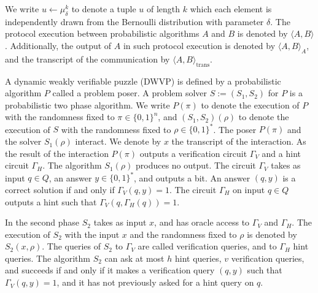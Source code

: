 %
%
\noindent
We write $u \leftarrow \mu_{\delta}^k$ to denote a tuple $u$ of length $k$ which each element
is independently drawn from the Bernoulli distribution with parameter $\delta$.
The protocol execution between probabilistic algorithms $A$ and $B$ is denoted by $\langle A, B \rangle$.
Additionally, the output of $A$ in such protocol execution is denoted by $\langle A, B \rangle_A$, and the transcript
of the communication by $\langle A, B \rangle_{\text{trans}}$.
%
\begin{definition}
  \label{def:dwvp}
  A dynamic weakly verifiable puzzle (DWVP) is defined by a probabilistic algorithm $P$
  called a problem poser.
  A problem solver $S := (S_1, S_2)$ for $P$ is a probabilistic two phase algorithm.
  We write $P(\pi)$ to denote the execution of $P$ with the randomness fixed to $\pi \in \{0,1\}^n$, and $(S_1,S_2)(\rho)$
  to denote the execution of $S$ with the randomness fixed to $\rho \in \{0,1\}^{*}$.
  The poser $P(\pi)$ and the solver $S_1(\rho)$ interact.
  We denote by $x$ the transcript of the interaction.
  As the result of the interaction $P(\pi)$ outputs a verification circuit $\Gamma_{V}$ and a hint circuit $\Gamma_{H}$.
  The algorithm $S_1(\rho)$ produces no output.
  The circuit $\Gamma_{V}$ takes as input $q \in Q$, an answer $y \in \{0,1\}^*$,
  and outputs a bit. An answer $(q,y)$ is a correct solution if and only if $\Gamma_V(q,y) = 1$.
  The circuit $\Gamma_H$ on input $q \in Q$ outputs a hint such that $\Gamma_V(q,\Gamma_H(q)) = 1$.

  In the second phase $S_2$ takes as input $x$, and has oracle access to $\Gamma_V$ and $\Gamma_H$.
  The execution of $S_2$ with the input $x$ and the randomness fixed to $\rho$
  is denoted by $S_2(x, \rho)$. The queries of $S_2$ to $\Gamma_V$ are called verification queries, and to $\Gamma_H$ hint queries.
  The algorithm $S_2$ can ask at most $h$ hint queries, $v$ verification queries, and succeeds if and only if
  it makes a verification query $(q,y)$ such that $\Gamma_V(q,y) = 1$, and it has not previously asked for a hint query on $q$.
\end{definition}
%

